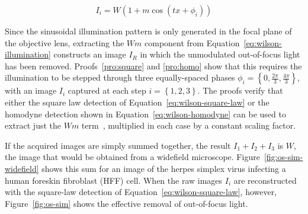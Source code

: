 \begin{equation} \label{eq:wilson-illumination}
I_i = W \left( 1 + m \cos \left(t x + \phi_i \right) \right)
\end{equation}

Since the sinusoidal illumination pattern is only generated in the focal plane of the objective lens, extracting the $Wm$ component from Equation~\ref{eq:wilson-illumination} constructs an image $I_R$ in which the unmodulated out-of-focus light has been removed. 
Proofs~\ref{pro:square} and \ref{pro:homo} show that this requires the illumination to be stepped through three equally-spaced phases $\phi_i = \left\lbrace0, \frac{2\pi}{3}, \frac{4\pi}{3}\right\rbrace$, with an image $I_i$ captured at each step $i=\left\lbrace1,2,3\right\rbrace$. 
The proofs verify that either the square law detection of Equation~\ref{eq:wilson-square-law} or the homodyne detection shown in Equation~\ref{eq:wilson-homodyne} can be used to extract just the $Wm$ term~\cite{neil1997method}, multiplied in each case by a constant scaling factor. 

If the acquired images are simply summed together, the result $I_1+I_2+I_3$ is $W$, the image that would be obtained from a widefield microscope. 
Figure~\ref{fig:os-sim-widefield} shows this sum for an image of the herpes simplex virus infecting a human foreskin fibroblast (HFF) cell. 
When the raw images $I_i$ are reconstructed with the square-law detection of Equation~\ref{eq:wilson-square-law}, however, Figure~\ref{fig:os-sim} shows the effective removal of out-of-focus light. 

